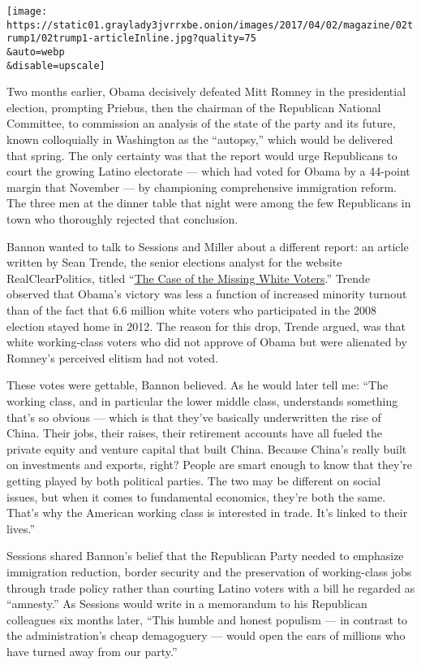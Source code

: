 \texttt{[image: https://static01.graylady3jvrrxbe.onion/images/2017/04/02/magazine/02trump1/02trump1-articleInline.jpg?quality=75\\\&auto=webp\\\&disable=upscale]}

Two months earlier, Obama decisively defeated Mitt Romney in the
presidential election, prompting Priebus, then the chairman of the
Republican National Committee, to commission an analysis of the state of
the party and its future, known colloquially in Washington as the
``autopsy,'' which would be delivered that spring. The only certainty
was that the report would urge Republicans to court the growing Latino
electorate --- which had voted for Obama by a 44-point margin that
November --- by championing comprehensive immigration reform. The three
men at the dinner table that night were among the few Republicans in
town who thoroughly rejected that conclusion.

Bannon wanted to talk to Sessions and Miller about a different report:
an article written by Sean Trende, the senior elections analyst for the
website RealClearPolitics, titled
``\href{http://www.realclearpolitics.com/articles/2012/11/08/the_case_of_the_missing_white_voters_116106.html}{The
Case of the Missing White Voters}.'' Trende observed that Obama's
victory was less a function of increased minority turnout than of the
fact that 6.6 million white voters who participated in the 2008 election
stayed home in 2012. The reason for this drop, Trende argued, was that
white working-class voters who did not approve of Obama but were
alienated by Romney's perceived elitism had not voted.

These votes were gettable, Bannon believed. As he would later tell me:
``The working class, and in particular the lower middle class,
understands something that's so obvious --- which is that they've
basically underwritten the rise of China. Their jobs, their raises,
their retirement accounts have all fueled the private equity and venture
capital that built China. Because China's really built on investments
and exports, right? People are smart enough to know that they're getting
played by both political parties. The two may be different on social
issues, but when it comes to fundamental economics, they're both the
same. That's why the American working class is interested in trade. It's
linked to their lives.''

Sessions shared Bannon's belief that the Republican Party needed to
emphasize immigration reduction, border security and the preservation of
working-class jobs through trade policy rather than courting Latino
voters with a bill he regarded as ``amnesty.'' As Sessions would write
in a memorandum to his Republican colleagues six months later, ``This
humble and honest populism --- in contrast to the administration's cheap
demagoguery --- would open the ears of millions who have turned away
from our party.''


